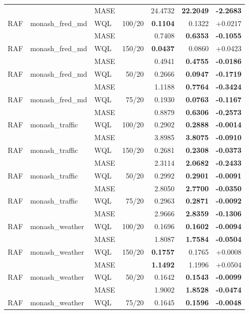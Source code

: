 \begin{longtable}{@{}lllrrrr@{}}
 &  & MASE &  & 24.4732 & \textbf{22.2049} & \textbf{-2.2683} \\
RAF & monash\_fred\_md & WQL & 100/20 & \textbf{0.1104} & 0.1322 & +0.0217 \\
 &  & MASE &  & 0.7408 & \textbf{0.6353} & \textbf{-0.1055} \\
RAF & monash\_fred\_md & WQL & 150/20 & \textbf{0.0437} & 0.0860 & +0.0423 \\
 &  & MASE &  & 0.4941 & \textbf{0.4755} & \textbf{-0.0186} \\
RAF & monash\_fred\_md & WQL & 50/20 & 0.2666 & \textbf{0.0947} & \textbf{-0.1719} \\
 &  & MASE &  & 1.1188 & \textbf{0.7764} & \textbf{-0.3424} \\
RAF & monash\_fred\_md & WQL & 75/20 & 0.1930 & \textbf{0.0763} & \textbf{-0.1167} \\
 &  & MASE &  & 0.8879 & \textbf{0.6306} & \textbf{-0.2573} \\
RAF & monash\_traffic & WQL & 100/20 & 0.2902 & \textbf{0.2888} & \textbf{-0.0014} \\
 &  & MASE &  & 3.8985 & \textbf{3.8075} & \textbf{-0.0910} \\
RAF & monash\_traffic & WQL & 150/20 & 0.2681 & \textbf{0.2308} & \textbf{-0.0373} \\
 &  & MASE &  & 2.3114 & \textbf{2.0682} & \textbf{-0.2433} \\
RAF & monash\_traffic & WQL & 50/20 & 0.2992 & \textbf{0.2901} & \textbf{-0.0091} \\
 &  & MASE &  & 2.8050 & \textbf{2.7700} & \textbf{-0.0350} \\
RAF & monash\_traffic & WQL & 75/20 & 0.2963 & \textbf{0.2871} & \textbf{-0.0092} \\
 &  & MASE &  & 2.9666 & \textbf{2.8359} & \textbf{-0.1306} \\
RAF & monash\_weather & WQL & 100/20 & 0.1696 & \textbf{0.1602} & \textbf{-0.0094} \\
 &  & MASE &  & 1.8087 & \textbf{1.7584} & \textbf{-0.0504} \\
RAF & monash\_weather & WQL & 150/20 & \textbf{0.1757} & 0.1765 & +0.0008 \\
 &  & MASE &  & \textbf{1.1492} & 1.1996 & +0.0504 \\
RAF & monash\_weather & WQL & 50/20 & 0.1642 & \textbf{0.1543} & \textbf{-0.0099} \\
 &  & MASE &  & 1.9002 & \textbf{1.8528} & \textbf{-0.0474} \\
RAF & monash\_weather & WQL & 75/20 & 0.1645 & \textbf{0.1596} & \textbf{-0.0048} \\

\end{longtable}
